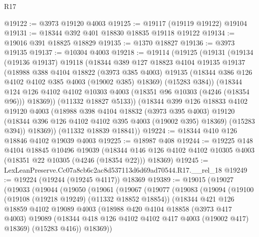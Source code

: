 \begin{lexlean}{R17}
\begin{coremodule}
@19122 := @3973 @19120 @4003
@19125 := @19117 (@19119 @19122) @19104
@19131 := @18344 @392 @401 @18830 @18835 @19118 @19122
@19134 := @19016 @391 @18825 @18829
@19135 := @1370 @18827
@19136 := @3973 @19135
@19137 := @10304 @4003
@19218 := @19114
    (@19125
      (@19131
        (@19134
          (@19136 @19137)
          @19118
          (@18344
            @389
            @127
            @18823
            @4104
            @19135
            @19137
            (@18988
              @388
              @4104
              @18822
              (@3973 @385 @4003)
              @19135
              (@18344 @386 @126 @4102 @4102 @385 @4003 (@19002 @385) @18369)
              (@15283 @384))
            (@18344
              @124
              @126
              @4102
              @4102
              @10303
              @4003
              (@18351 @96 @10303 (@4246 (@18354 @96)))
              @18369))
          (@11332 @18827 @5133))
        (@18344
          @399
          @126
          @18833
          @4102
          @19120
          @4003
          (@18988
            @398
            @4104
            @18832
            (@3973 @395 @4003)
            @19120
            (@18344 @396 @126 @4102 @4102 @395 @4003 (@19002 @395) @18369)
            (@15283 @394))
          @18369))
      (@11332 @18839 @18841))
@19224 := @18344 @410 @126 @18846 @4102 @19039 @4003
@19225 := @18987 @408
@19244 := @19225
    @148
    @4104
    @18845
    @10496
    @19039
    (@18344 @146 @126 @4102 @4102 @10305 @4003 (@18351 @22 @10305 (@4246 (@18354 @22))) @18369)
@19245 := LexLeanPreserve.Cc07a8cb6c2ac8d537113d6d69ad70544.R17.__rel_18
@19249 := @19224 (@19244 (@19245 @4117)) @18369
@19389 := @19015
    (@19027
      (@19033
        (@19044
          (@19050
            (@19061
              (@19067
                (@19077
                  (@19083
                    (@19094
                      (@19100
                        (@19108 (@19218 @19249) (@11332 @18852 @18854))
                        (@18344
                          @421
                          @126
                          @18859
                          @4102
                          @19089
                          @4003
                          (@18988
                            @420
                            @4104
                            @18858
                            (@3973 @417 @4003)
                            @19089
                            (@18344 @418 @126 @4102 @4102 @417 @4003 (@19002 @417) @18369)
                            (@15283 @416))
                          @18369))

\end{coremodule}
\end{lexlean}
